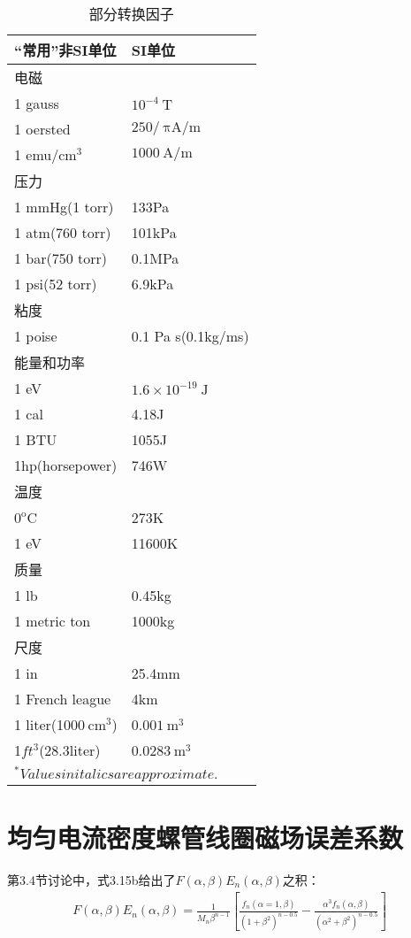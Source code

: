 \begin{table}[htbp]\small
\centering
\caption{部分转换因子}%
\begin{tabular}{|l|l|}
\hline
``常用''非SI单位 & SI单位 \\ \hline
电磁 & \\ \hline
1 gauss & $10^{-4}\ \mathrm{T}$ \\ \hline
1 oersted & $250/\ \mathrm{\pi A/m}$ \\ \hline
1 emu/$\mathrm{cm^3}$ & $1000\ \mathrm{A/m}$ \\ \hline
压力& \\ \hline
1 mmHg(1 torr) & 133Pa \\ \hline
1 atm(760 torr) & 101kPa \\ \hline
1 bar(750 torr) & 0.1MPa \\ \hline
1 psi(52 torr) & 6.9kPa \\ \hline
粘度& \\ \hline
1 poise & 0.1 Pa s(0.1kg/ms) \\ \hline
能量和功率 & \\ \hline
1 eV & $1.6\times10^{-19}\ \mathrm{J}$ \\ \hline
1 cal & 4.18J \\ \hline
1 BTU & 1055J \\ \hline
1hp(horsepower) & 746W \\ \hline
温度 & \\ \hline
$0^\mathrm{o}\mathrm{C}$ & 273K \\ \hline
1 eV & 11600K \\ \hline
质量 & \\ \hline
1 lb & 0.45kg \\ \hline
1 metric ton & 1000kg \\ \hline
尺度 & \\ \hline
1 in & 25.4mm \\ \hline
1 French league & 4km \\ \hline
1 liter(1000$\ \mathrm{cm^3}$) & $0.001\ \mathrm{m^3}$ \\ \hline
1$ft^3$(28.3liter) & $0.0283\ \mathrm{m^3}$ \\ \hline
\multicolumn{2}{|l|}{$ ^*Values in italics are approximate.$} \\ \hline
\end{tabular}
\end{table}
\newpage

\section{均匀电流密度螺管线圈磁场误差系数}
第3.4节讨论中，式3.15b给出了$F(\alpha,\beta) E_{n}(\alpha,\beta)$之积：
\begin{align*}
F(\alpha,\beta) E_{n}(\alpha,\beta)=\frac{1}{M_n \beta^{n-1}}\left[\frac{f_n(\alpha=1,\beta)}{(1+\beta^2)^{n-0.5}}-\frac{\alpha^3 f_n(\alpha,\beta)}{(\alpha^2+\beta^2)^{n-0.5}}\right] \tag{3.15b}
\end{align*}

